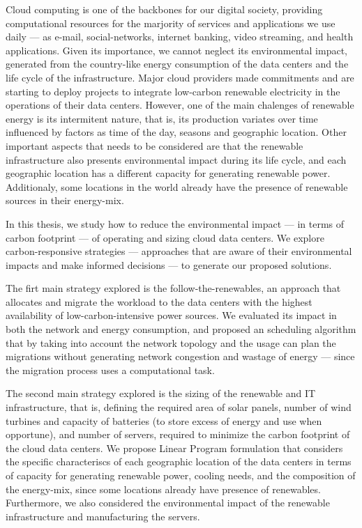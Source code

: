 Cloud computing is one of the backbones for our digital society, providing computational resources for the marjority of services and applications we use daily --- as e-mail, social-networks, internet banking, video streaming, and health applications. Given its importance, we cannot neglect its environmental impact, generated from the country-like energy consumption of the data centers and the life cycle of the infrastructure. Major cloud providers made commitments and are starting to deploy projects to integrate low-carbon renewable electricity in the operations of their data centers. However, one of the main chalenges of renewable energy is its intermitent nature, that is, its production variates over time influenced by factors as time of the day, seasons and geographic location. Other important aspects that needs to be considered are that the renewable infrastructure also presents environmental impact during its life cycle, and each geographic location has a different capacity for generating renewable power. Additionaly, some locations in the world already have the presence of renewable sources in their energy-mix.

In this thesis, we study how to reduce the environmental impact --- in terms of carbon footprint --- of operating and sizing cloud data centers. We explore carbon-responsive strategies --- approaches that are aware of their environmental impacts and make informed decisions --- to generate our proposed solutions.

The firt main strategy explored is the follow-the-renewables, an approach that allocates and migrate the workload to the data centers with the highest availability of low-carbon-intensive power sources. We evaluated its impact in both the network and energy consumption, and proposed an scheduling algorithm that by taking into account the network topology and the usage can plan the migrations without generating network congestion and wastage of energy --- since the migration process uses a computational task.

The second main strategy explored is the sizing of the renewable and IT infrastructure, that is, defining the required area of solar panels, number of wind turbines and capacity of batteries (to store excess of energy and use when opportune), and number of servers, required to minimize the carbon footprint of the cloud data centers. We propose Linear Program formulation that considers the specific characteriscs of each geographic location of the data centers in terms of capacity for generating renewable power, cooling needs, and the composition of the energy-mix, since some locations already have presence of renewables. Furthermore, we also considered the environmental impact of the renewable infrastructure and manufacturing the servers. 


